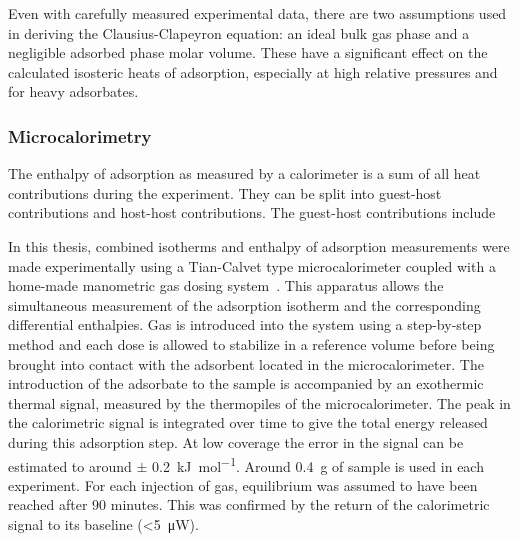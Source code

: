 Even with carefully measured experimental data, there are two 
assumptions used in deriving the Clausius-Clapeyron equation: 
an ideal bulk gas phase and a negligible adsorbed phase
molar volume. These have a significant effect on the calculated 
isosteric heats of adsorption, especially at high relative pressures 
and for heavy adsorbates.

\subsubsection{Microcalorimetry}


The enthalpy of adsorption as measured by a calorimeter is a 
sum of all heat contributions during the experiment. They can 
be split into guest-host contributions and host-host contributions.
The guest-host contributions include 

In this thesis, combined isotherms and enthalpy of adsorption
measurements were made experimentally using a Tian-Calvet type
microcalorimeter coupled with a home-made manometric gas dosing
system~\cite{llewellynGasAdsorptionMicrocalorimetry2005}. 
This apparatus allows the simultaneous measurement 
of the adsorption isotherm and the corresponding differential 
enthalpies. Gas is introduced into the system using a step-by-step
method and each dose is allowed to stabilize in a
reference volume before being brought into contact with the
adsorbent located in the microcalorimeter. The introduction of the
adsorbate to the sample is accompanied by an exothermic thermal signal,
measured by the thermopiles of the microcalorimeter. The peak in the
calorimetric signal is integrated over time 
to give the total energy released during this adsorption step.
At low coverage the error in the signal can be estimated to around 
\( \pm \) \SI{0.2} {\kilo\joule\per\mol}. Around \SI{0.4}{\gram} of 
sample is used in each experiment. 
For each injection of gas, equilibrium was assumed to have
been reached after 90 minutes. This was confirmed by the return
of the calorimetric signal to its baseline (<\SI{5}{\micro\watt}).

